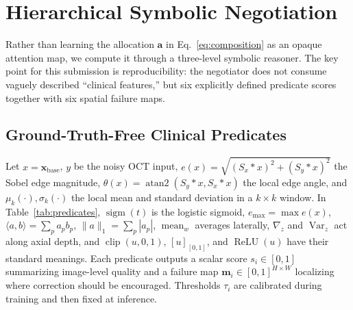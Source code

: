 \documentclass{ieeetj}
\begin{document}
\section{Hierarchical Symbolic Negotiation}
\label{sec:negotiator}

Rather than learning the allocation $\mathbf{a}$ in Eq.~\eqref{eq:composition} as an opaque attention map, we compute it through a three-level symbolic reasoner. The key point for this submission is reproducibility: the negotiator does not consume vaguely described ``clinical features,'' but six explicitly defined predicate scores together with six spatial failure maps.

\subsection{Ground-Truth-Free Clinical Predicates}
\label{sec:predicates}
Let $x=\hat{\mathbf{x}}_\text{base}$, $y$ be the noisy OCT input, $e(x)=\sqrt{(S_x*x)^2+(S_y*x)^2}$ the Sobel edge magnitude, $\theta(x)=\operatorname{atan2}(S_y*x,S_x*x)$ the local edge angle, and $\mu_k(\cdot),\sigma_k(\cdot)$ the local mean and standard deviation in a $k\times k$ window. In Table~\ref{tab:predicates}, $\operatorname{sigm}(t)$ is the logistic sigmoid, $e_{\max}=\max e(x)$, $\langle a,b\rangle=\sum_p a_p b_p$, $\|a\|_1=\sum_p |a_p|$, $\operatorname{mean}_w$ averages laterally, $\nabla_z$ and $\operatorname{Var}_z$ act along axial depth, and $\operatorname{clip}(u,0,1)$, $[u]_{[0,1]}$, and $\operatorname{ReLU}(u)$ have their standard meanings. Each predicate outputs a scalar score $s_i\in[0,1]$ summarizing image-level quality and a failure map $\mathbf{m}_i\in[0,1]^{H\times W}$ localizing where correction should be encouraged. Thresholds $\tau_i$ are calibrated during training and then fixed at inference.
\end{document}
